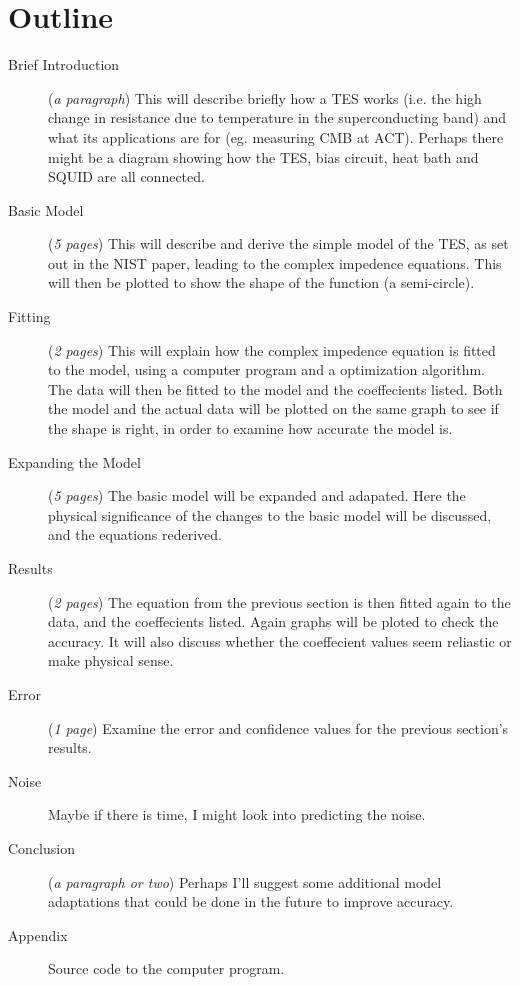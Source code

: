 \documentclass[letterpaper,10pt]{article}
\begin{document}
\section{Outline}
\begin{description}
\item[Brief Introduction] (\emph{a paragraph}) This will describe briefly how a TES works (i.e. the high change in resistance due to temperature in the superconducting band) and what its applications are for (eg. measuring CMB at ACT). Perhaps there might be a diagram showing how the TES, bias circuit, heat bath and SQUID are all connected.
\item[Basic Model] (\emph{5 pages}) This will describe and derive the simple model of the TES, as set out in the NIST paper, leading to the complex impedence equations. This will then be plotted to show the shape of the function (a semi-circle).
\item[Fitting] (\emph{2 pages}) This will explain how the complex impedence equation is fitted to the model, using a computer program and a optimization algorithm. The data will then be fitted to the model and the coeffecients listed. Both the model and the actual data will be plotted on the same graph to see if the shape is right, in order to examine how accurate the model is.
\item[Expanding the Model] (\emph{5 pages}) The basic model will be expanded and adapated. Here the physical significance of the changes to the basic model will be discussed, and the equations rederived.
\item[Results] (\emph{2 pages}) The equation from the previous section is then fitted again to the data, and the coeffecients listed. Again graphs will be ploted to check the accuracy. It will also discuss whether the coeffecient values seem reliastic or make physical sense.
\item[Error] (\emph{1 page}) Examine the error and confidence values for the previous section's results.
\item[Noise] Maybe if there is time, I might look into predicting the noise.
\item[Conclusion] (\emph{a paragraph or two}) Perhaps I'll suggest some additional model adaptations that could be done in the future to improve accuracy. 
\item[Appendix] Source code to the computer program.
\end{description}
\end{document}
